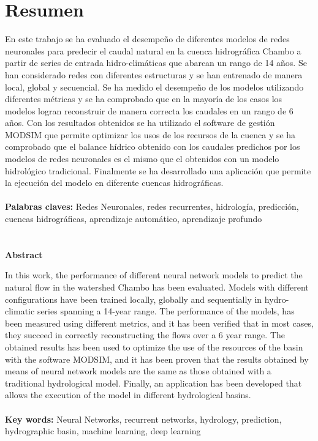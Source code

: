 \setcounter{page}{1}
\chapter*{Resumen}

En este trabajo se ha evaluado el desempeño de diferentes modelos de redes neuronales
para predecir el caudal natural en la cuenca hidrográfica Chambo  a partir de series de
entrada hidro-climáticas que abarcan un rango de 14 años. Se han considerado redes con
diferentes estructuras y se han entrenado de manera local, global y secuencial. Se ha medido el
desempeño de los modelos utilizando diferentes métricas y se ha comprobado que en la
mayoría de los casos los modelos logran reconstruir de manera correcta los caudales en un
rango de 6 años. Con los resultados obtenidos se ha utilizado el software de gestión MODSIM
que permite optimizar los usos de los recursos de la cuenca y se ha comprobado que el balance hídrico 
obtenido con los caudales predichos por los modelos de redes neuronales es el mismo que el obtenidos con un
modelo hidrológico tradicional. Finalmente se ha desarrollado una aplicación que permite la ejecución del modelo
en diferente cuencas hidrográficas.\\
\\
\textbf{Palabras claves:} Redes Neuronales, redes recurrentes, hidrología, predicción, cuencas hidrográficas, aprendizaje automático, aprendizaje profundo\\
\\
\\
\large{\textbf{Abstract}}
\vspace{5mm}

In this work, the performance of different neural network models
to predict the natural flow in the  watershed Chambo  has been evaluated. 
Models with different configurations  have been trained locally, globally and sequentially  in 
hydro-climatic series spanning a 14-year range.
The performance of the models, has been measured
using different metrics, and it has been verified that in most cases, they succeed in correctly reconstructing the flows over a
6 year range. The obtained results  has been used to optimize the use of the resources of the basin with the software MODSIM, 
and it has been proven that the results obtained by means of neural network models are the same as those obtained with a
traditional hydrological model. Finally, an application has been developed that allows the execution of the model
in different hydrological basins.\\
\\
\textbf{Key words:} Neural Networks, recurrent networks, hydrology, prediction, hydrographic basin, machine learning, deep learning